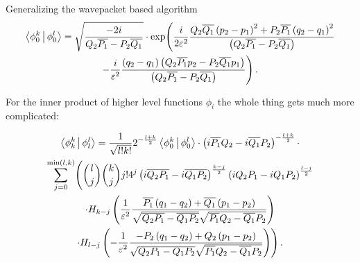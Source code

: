 \begin{chapter}{Generalizing the wavepacket based algorithm}
\begin{multline} \label{eq:multifamily_innerp_ground}
  \Braket{ \phi_0^k | \phi_0^l } =
  \sqrt{\frac{-2 i}{Q_2 \overline{P_1} - P_2 \overline{Q_1}}} \cdot
    \exp \Biggl(
      \frac{i}{2 \varepsilon^2}
      \frac{Q_2 \overline{Q_1} \left(p_2-p_1\right)^2 + P_2 \overline{P_1} \left(q_2-q_1\right)^2}
            {\left(Q_2 \overline{P_1} - P_2 \overline{Q_1}\right)}
    \\
    -\frac{i}{\varepsilon^2}
    \frac{\left(q_2-q_1\right) \left( Q_2 \overline{P_1} p_2 - P_2 \overline{Q_1} p_1\right)}
         {\left(Q_2 \overline{P_1} - P_2 \overline{Q_1}\right)}
    \Biggr) \,.
\end{multline}

For the inner product of higher level functions $\phi_i$ the whole thing gets much
more complicated:


\begin{multline}
  \Braket{ \phi_k^k | \phi_l^l } =
  \frac{1}{\sqrt{l!k!}} 2^{-\frac{l+k}{2}} \Braket{ \phi_0^k | \phi_0^l } \cdot
  \left(i \overline{ P_1} Q_2 - i \overline{Q_1} P_2\right)^{-\frac{l+k}{2}} \cdot \\
  \sum_{j=0}^{\min\left(l,k\right)}
    \Biggl(
      \binom{l}{j} \binom{k}{j} j! 4^j \left(i \overline{Q_2 P_1}-i\overline{Q_1 P_2}\right)^{\frac{k-j}{2}}
      \left(i Q_2  P_1 - i Q_1  P_2\right)^{\frac{l-j}{2}}
      \\
      \cdot H_{k-j}\left(\frac{1}{\varepsilon^2}
                   \frac{\overline{ P_1}\left(q_1-q_2\right)+\overline{Q_1}\left(p_1-p_2\right)}
                        {\sqrt{\overline{Q_2 P_1}-\overline{Q_1 P_2}}\sqrt{\overline{ P_1}Q_2-\overline{Q_1} P_2}}\right)
      \\
      \cdot H_{l-j}\left(-\frac{1}{\varepsilon^2}
                    \frac{-P_2\left(q_1-q_2\right)+Q_2\left(p_1-p_2\right)}
                         {\sqrt{Q_2 P_1 - Q_1 P_2}\sqrt{\overline{P_1}Q_2-\overline{Q_1} P_2}}\right)
    \Biggr) \,.
\end{multline}


\end{chapter}
